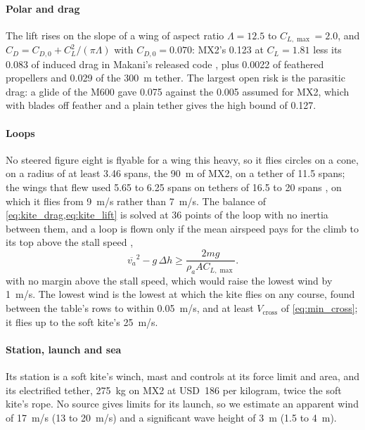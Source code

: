 \paragraph{Polar and drag} The lift rises on the slope of a wing of aspect ratio $\Lambda=12.5$ to $C_{L,\max}=2.0$, and $C_D = C_{D,0} + C_L^2/(\pi\Lambda)$ with $C_{D,0}=0.070$: MX2's 0.123 at $C_L=1.81$ \citep{echeverri2020part1} less its 0.083 of induced drag in Makani's released code \citep{makani2020code}, plus 0.0022 of feathered propellers \citep{hartman1933} and 0.029 of the \SI{300}{m} tether. The largest open risk is the parasitic drag: a glide of the M600 gave 0.075 against the 0.005 assumed for MX2, which with blades off feather and a plain tether gives the high bound of 0.127.

\paragraph{Loops} No steered figure eight is flyable for a wing this heavy, so it flies circles on a cone, on a radius of at least 3.46 spans, the \SI{90}{m} of MX2, on a tether of 11.5 spans; the wings that flew used 5.65 to 6.25 spans on tethers of 16.5 to 20 spans \citep{vanderlind2013}, on which it flies from \SI{9}{m/s} rather than \SI{7}{m/s}. The balance of \cref{eq:kite_drag,eq:kite_lift} is solved at 36 points of the loop with no inertia between them, and a loop is flown only if the mean airspeed pays for the climb to its top above the stall speed \citep{vanderlind2013},
\begin{equation}
\overline{v_a}^2 - g\,\Delta h \geq \frac{2mg}{\rho_a A C_{L,\max}}.
\label{eq:loop_top}
\end{equation}
with no margin above the stall speed, which would raise the lowest wind by \SI{1}{m/s}. The lowest wind is the lowest at which the kite flies on any course, found between the table's rows to within \SI{0.05}{m/s}, and at least $V_\mathrm{cross}$ of \cref{eq:min_cross}; it flies up to the soft kite's \SI{25}{m/s}.

\paragraph{Station, launch and sea} Its station is a soft kite's winch, mast and controls at its force limit and area, and its electrified tether, \SI{275}{kg} on MX2 at USD~186 per kilogram, twice the soft kite's rope. No source gives limits for its launch, so we estimate an apparent wind of \SI{17}{m/s} (13 to \SI{20}{m/s}) and a significant wave height of \SI{3}{m} (1.5 to \SI{4}{m}).

